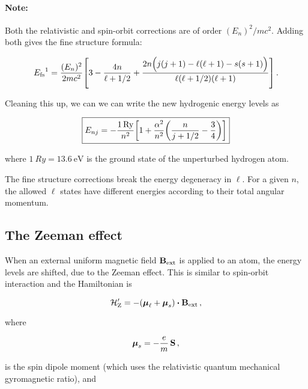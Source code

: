 \documentclass[12pt, titlepage]{article}
\begin{document}
\begin{mdframed}
\paragraph*{Note:} Both the relativistic and spin-orbit corrections are of order $(E_n)^2/mc^2$. Adding both gives the fine structure formula:

\begin{equation}
	{E_\text{fs}}^{1} = \frac{(E_n)^2}{2mc^2}\qty[3 - \frac{4n}{\ell+1/2} + \frac{2n\Bigl(j(j+1) - \ell(\ell+1) - s(s+1)\Bigr)}{\ell(\ell+1/2)(\ell+1)}] \,.
\end{equation}

Cleaning this up, we can we can write the new hydrogenic energy levels as

\begin{equation}
	\boxed{E_{nj} = -\frac{\SI{1}{Ry}}{n^2}\qty[1 + \frac{\alpha^2}{n^2}\qty(\frac{n}{j+1/2} - \frac{3}{4})]}
\end{equation}

where $\SI{1}{Ry} = \SI{13.6}{\eV}$ is the ground state of the unperturbed hydrogen atom. 
\end{mdframed}

The fine structure corrections break the energy degeneracy in $\ell$. For a given $n$, the allowed $\ell$ states have different energies according to their total angular momentum.


\subsection{The Zeeman effect}
When an external uniform magnetic field $\vb{B}_\text{ext}$ is applied to an atom, the energy levels are shifted, due to the Zeeman effect. This is similar to spin-orbit interaction and the Hamiltonian is

\begin{equation}
	\mathcal{H}_{\text{Z}}^\prime = -(\vb*{\mu}_\ell + \vb*{\mu}_s)\vdot\vb{B}_\text{ext} \,,
\end{equation}

where 

\begin{equation}
	\vb*{\mu}_s = -\frac{e}{m}\,\vb{S} \,,
\end{equation}

is the spin dipole moment (which uses the relativistic quantum mechanical gyromagnetic ratio), and
\end{document}
